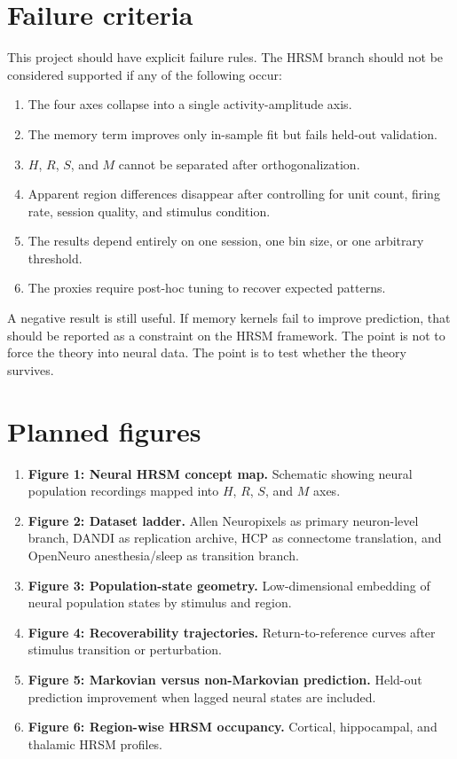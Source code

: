 \documentclass[11pt]{article}
\begin{document}
\section{Failure criteria}

This project should have explicit failure rules. The HRSM branch should not be considered supported if any of the following occur:

\begin{enumerate}
    \item The four axes collapse into a single activity-amplitude axis.
    \item The memory term improves only in-sample fit but fails held-out validation.
    \item $H$, $R$, $S$, and $M$ cannot be separated after orthogonalization.
    \item Apparent region differences disappear after controlling for unit count, firing rate, session quality, and stimulus condition.
    \item The results depend entirely on one session, one bin size, or one arbitrary threshold.
    \item The proxies require post-hoc tuning to recover expected patterns.
\end{enumerate}

A negative result is still useful. If memory kernels fail to improve prediction, that should be reported as a constraint on the HRSM framework. The point is not to force the theory into neural data. The point is to test whether the theory survives.

\section{Planned figures}

\begin{enumerate}
    \item \textbf{Figure 1: Neural HRSM concept map.} Schematic showing neural population recordings mapped into $H$, $R$, $S$, and $M$ axes.
    \item \textbf{Figure 2: Dataset ladder.} Allen Neuropixels as primary neuron-level branch, DANDI as replication archive, HCP as connectome translation, and OpenNeuro anesthesia/sleep as transition branch.
    \item \textbf{Figure 3: Population-state geometry.} Low-dimensional embedding of neural population states by stimulus and region.
    \item \textbf{Figure 4: Recoverability trajectories.} Return-to-reference curves after stimulus transition or perturbation.
    \item \textbf{Figure 5: Markovian versus non-Markovian prediction.} Held-out prediction improvement when lagged neural states are included.
    \item \textbf{Figure 6: Region-wise HRSM occupancy.} Cortical, hippocampal, and thalamic HRSM profiles.
\end{enumerate}
\end{document}
